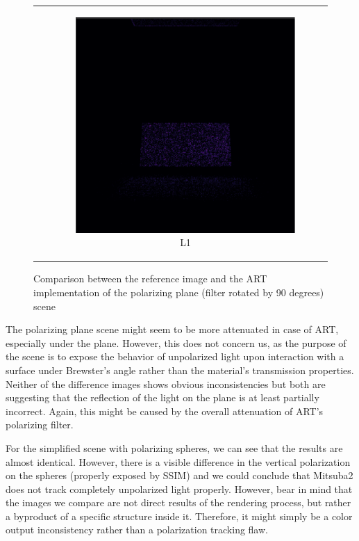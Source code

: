 \begin{figure}[h]
\begin{tabular}{cc}
\begin{subfigure}
			\caption{SSIM}
		\end{subfigure} 
		&
		\begin{subfigure}
			{0.4\textwidth}\centering\includegraphics[width=\linewidth]{img/polarizing_plane_90_L1.png}
			\caption{L1}
		\end{subfigure}
	\end{tabular}
	\caption{Comparison between the reference image and the ART implementation of the polarizing plane (filter rotated by 90 degrees) scene}
	\label{fig:compare_polar_angle}
\end{figure}

The polarizing plane scene might seem to be more attenuated in case of ART, especially under the plane. However, this does not concern us, as the purpose of the scene is to expose the behavior of unpolarized light upon interaction with a surface under Brewster's angle rather than the material's transmission properties. Neither of the difference images shows obvious inconsistencies but both are suggesting that the reflection of the light on the plane is at least partially incorrect. Again, this might be caused by the overall attenuation of ART's polarizing filter.

For the simplified scene with polarizing spheres, we can see that the results are almost identical. However, there is  a visible difference in the vertical polarization on the spheres (properly exposed by SSIM) and we could conclude that Mitsuba2 does not track completely unpolarized light properly. However, bear in mind that the images we compare are not direct results of the rendering process, but rather a byproduct of a specific structure inside it. Therefore, it might simply be a color output inconsistency rather than a polarization tracking flaw.